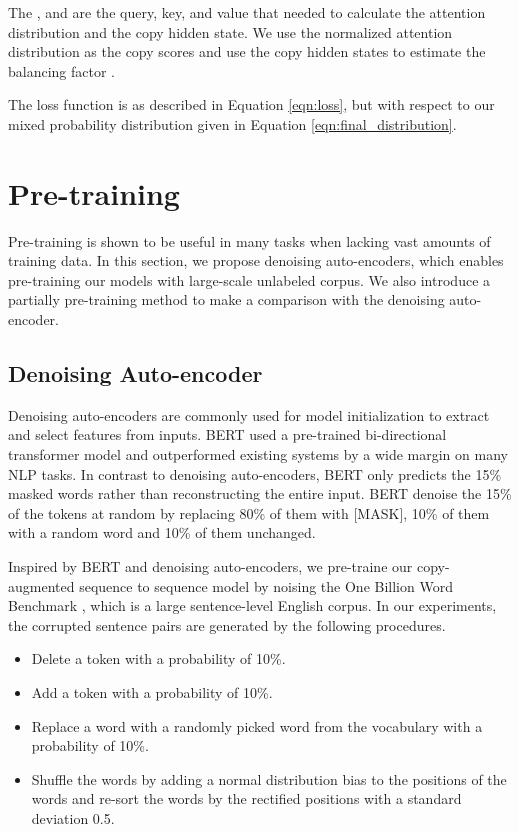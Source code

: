 \documentclass[11pt,a4paper]{article}
\begin{document}
\vspace{-3pt}


\vspace{-3pt}



The ,  and  are the query, key, and value that needed to calculate the attention distribution and the copy hidden state. We use the normalized attention distribution as the copy scores and use the copy hidden states to estimate the balancing factor . 




The loss function is as described in Equation \ref{eqn:loss}, but with respect to our mixed probability distribution  given in Equation \ref{eqn:final_distribution}.


\section{Pre-training}
Pre-training is shown to be useful in many tasks when lacking vast amounts of training data. In this section, we propose denoising auto-encoders, which enables pre-training our models with large-scale unlabeled corpus. We also introduce a partially pre-training method to make a comparison with the denoising auto-encoder. 

\subsection{Denoising Auto-encoder}
Denoising auto-encoders \cite{vincent2008extracting} are commonly used for model initialization to extract and select features from inputs. BERT \cite{devlin2018bert} used a pre-trained bi-directional transformer model and outperformed existing systems by a wide margin on many NLP tasks. In contrast to denoising auto-encoders, BERT only predicts the 15\% masked words rather than reconstructing the entire input. BERT denoise the 15\% of the tokens at random by replacing 80\% of them with [MASK], 10\% of them with a random word and 10\% of them unchanged. 

Inspired by BERT and denoising auto-encoders, we pre-traine our copy-augmented sequence to sequence model by noising the One Billion Word Benchmark \cite{chelba2013one}, which is a large sentence-level English corpus. In our experiments, the corrupted sentence pairs are generated by the following procedures.

\begin{itemize}
\item Delete a token with a probability of 10\%.
\item Add a token with a probability of 10\%. 
\item Replace a word with a randomly picked word from the vocabulary with a probability of 10\%.
\item Shuffle the words by adding a normal distribution bias to the positions of the words and re-sort the words by the rectified positions with a standard deviation 0.5.
\end{itemize}
\end{document}
